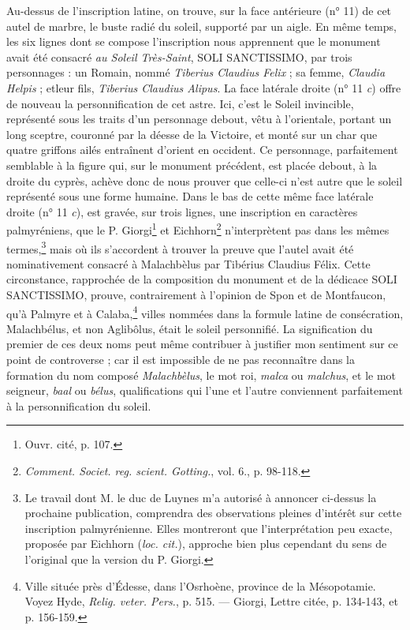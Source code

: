 \documentclass[a4paper, 11pt, oneside, polutonikogreek, french]{article}
\begin{document}
Au-dessus de l'inscription latine, on trouve, sur la face antérieure (n° 11) de cet autel de marbre, le buste radié du soleil, supporté par un aigle. En même temps, les six lignes dont se compose l'inscription nous apprennent que le monument avait été consacré \emph{au Soleil Très-Saint}, SOLI SANCTISSIMO, par trois personnages : un Romain, nommé \emph{Tiberius Claudius Felix} ; sa femme, \emph{Claudia Helpis} ; etleur fils, \emph{Tiberius Claudius Alipus}. La face latérale droite (n° 11 \emph{c}) offre de nouveau la personnification de cet astre. Ici, c'est le Soleil invincible, représenté sous les traits d'un personnage debout, vêtu à l'orientale, portant un long sceptre, couronné par la déesse de la Victoire, et monté sur un char que quatre griffons ailés entraînent d'orient en occident. Ce personnage, parfaitement semblable à la figure qui, sur le monument précédent, est placée debout, à la droite du cyprès, achève donc de nous prouver que celle-ci n'est autre que le soleil représenté sous une forme humaine. Dans le bas de cette même face latérale droite (n° 11 \emph{c}), est gravée, sur trois lignes, une inscription en caractères palmyréniens, que le P. Giorgi\footnote{Ouvr. cité, p. 107.} et Eichhorn\footnote{\emph{Comment. Societ. reg. scient. Gotting.}, vol. 6., p. 98-118.} n'interprètent pas dans les mêmes termes,\footnote{Le travail dont M. le duc de Luynes m'a autorisé à annoncer ci-dessus la prochaine publication, comprendra des observations pleines d'intérêt sur cette inscription palmyrénienne. Elles montreront que l'interprétation peu exacte, proposée par Eichhorn (\emph{loc. cit.}), approche bien plus cependant du sens de l'original que la version du P. Giorgi.} mais où ils s'accordent à trouver la preuve que l'autel avait été nominativement consacré à Malachbèlus par Tibérius Claudius Félix. Cette circonstance, rapprochée de la composition du monument et de la dédicace SOLI SANCTISSIMO, prouve, contrairement à l'opinion de Spon et de Montfaucon, qu'à Palmyre et à Calaba,\footnote{Ville située près d'Édesse, dans l'Osrhoène, province de la Mésopotamie. Voyez Hyde, \emph{Relig. veter. Pers.}, p. 515. --- Giorgi, Lettre citée, p. 134-143, et p. 156-159.} villes nommées dans la formule latine de consécration, Malachbélus, et non Aglibôlus, était le soleil personnifié. La signification du premier de ces deux noms peut même contribuer à justifier mon sentiment sur ce point de controverse ; car il est impossible de ne pas reconnaître dans la formation du nom composé \emph{Malachbèlus}, le mot roi, \emph{malca} ou \emph{malchus}, et le mot seigneur, \emph{baal} ou \emph{bélus}, qualifications qui l'une et l'autre conviennent parfaitement à la personnification du soleil.
\end{document}
